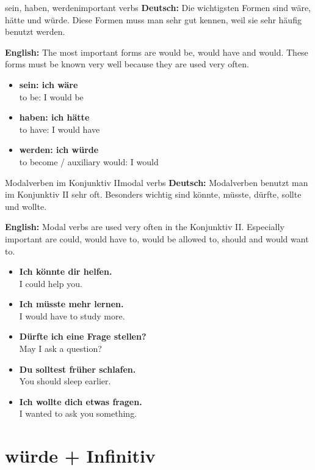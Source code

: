 \documentclass[a4paper,11pt]{article}
\newcommand{\GermanText}[1]{\textbf{Deutsch: }#1\par}
\newcommand{\EnglishText}[1]{{\small\color{SoftGray}\textbf{English: }#1\par}}
\newcommand{\ExampleItem}[2]{\item \textbf{#1}\\{\small\color{SoftGray}#2}}
\begin{document}
    \begin{grammarentry}{sein, haben, werden}{important verbs}
        \GermanText{Die wichtigsten Formen sind wäre, hätte und würde. Diese Formen muss man sehr gut kennen, weil sie sehr häufig benutzt werden.}
        \EnglishText{The most important forms are would be, would have and would. These forms must be known very well because they are used very often.}
        
        \begin{exbox}
            \begin{itemize}
                \ExampleItem{sein: ich wäre}{to be: I would be}
                \ExampleItem{haben: ich hätte}{to have: I would have}
                \ExampleItem{werden: ich würde}{to become / auxiliary would: I would}
            \end{itemize}
        \end{exbox}
    \end{grammarentry}
    
    \begin{grammarentry}{Modalverben im Konjunktiv II}{modal verbs}
        \GermanText{Modalverben benutzt man im Konjunktiv II sehr oft. Besonders wichtig sind könnte, müsste, dürfte, sollte und wollte.}
        \EnglishText{Modal verbs are used very often in the Konjunktiv II. Especially important are could, would have to, would be allowed to, should and would want to.}
        
        \begin{exbox}
            \begin{itemize}
                \ExampleItem{Ich könnte dir helfen.}{I could help you.}
                \ExampleItem{Ich müsste mehr lernen.}{I would have to study more.}
                \ExampleItem{Dürfte ich eine Frage stellen?}{May I ask a question?}
                \ExampleItem{Du solltest früher schlafen.}{You should sleep earlier.}
                \ExampleItem{Ich wollte dich etwas fragen.}{I wanted to ask you something.}
            \end{itemize}
        \end{exbox}
    \end{grammarentry}
    
    \section{würde + Infinitiv}
    
\end{document}
